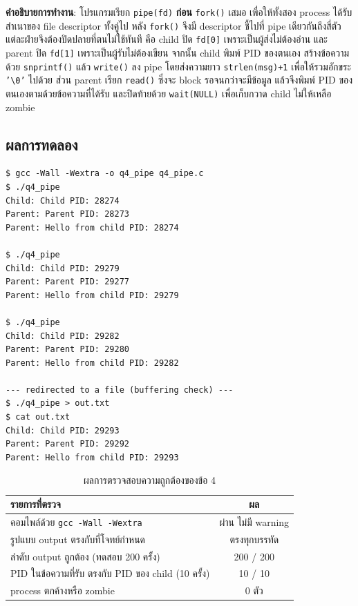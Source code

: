 \documentclass[a4paper,12pt]{article}
\newcommand{\code}[1]{\texttt{#1}}
\begin{document}
\textbf{คำอธิบายการทำงาน}: โปรแกรมเรียก \code{pipe(fd)} \textbf{ก่อน} \code{fork()} เสมอ เพื่อให้ทั้งสอง process ได้รับสำเนาของ file descriptor ทั้งคู่ไป หลัง \code{fork()} จึงมี descriptor ชี้ไปที่ pipe เดียวกันถึงสี่ตัว แต่ละฝ่ายจึงต้องปิดปลายที่ตนไม่ใช้ทันที คือ child ปิด \code{fd[0]} เพราะเป็นผู้ส่งไม่ต้องอ่าน และ parent ปิด \code{fd[1]} เพราะเป็นผู้รับไม่ต้องเขียน จากนั้น child พิมพ์ PID ของตนเอง สร้างข้อความด้วย \code{snprintf()} แล้ว \code{write()} ลง pipe โดยส่งความยาว \code{strlen(msg)+1} เพื่อให้รวมอักขระ \code{'\textbackslash 0'} ไปด้วย ส่วน parent เรียก \code{read()} ซึ่งจะ block รอจนกว่าจะมีข้อมูล แล้วจึงพิมพ์ PID ของตนเองตามด้วยข้อความที่ได้รับ และปิดท้ายด้วย \code{wait(NULL)} เพื่อเก็บกวาด child ไม่ให้เหลือ zombie

\newpage

\subsection{ผลการทดลอง}

\begin{lstlisting}[style=terminal,caption={ผลลัพธ์ของข้อ 4 (รันซ้ำหลายครั้ง)}]
$ gcc -Wall -Wextra -o q4_pipe q4_pipe.c
$ ./q4_pipe
Child: Child PID: 28274
Parent: Parent PID: 28273
Parent: Hello from child PID: 28274

$ ./q4_pipe
Child: Child PID: 29279
Parent: Parent PID: 29277
Parent: Hello from child PID: 29279

$ ./q4_pipe
Child: Child PID: 29282
Parent: Parent PID: 29280
Parent: Hello from child PID: 29282

--- redirected to a file (buffering check) ---
$ ./q4_pipe > out.txt
$ cat out.txt
Child: Child PID: 29293
Parent: Parent PID: 29292
Parent: Hello from child PID: 29293
\end{lstlisting}

\begin{table}[H]
\centering
\caption{ผลการตรวจสอบความถูกต้องของข้อ 4}
\begin{tabular}{lc}
\toprule
\textbf{รายการที่ตรวจ} & \textbf{ผล} \\
\midrule
คอมไพล์ด้วย \code{gcc -Wall -Wextra} & ผ่าน ไม่มี warning \\
รูปแบบ output ตรงกับที่โจทย์กำหนด & ตรงทุกบรรทัด \\
ลำดับ output ถูกต้อง (ทดสอบ 200 ครั้ง) & 200 / 200 \\
PID ในข้อความที่รับ ตรงกับ PID ของ child (10 ครั้ง) & 10 / 10 \\
process ตกค้างหรือ zombie & 0 ตัว \\
\bottomrule
\end{tabular}
\end{table}
\end{document}
